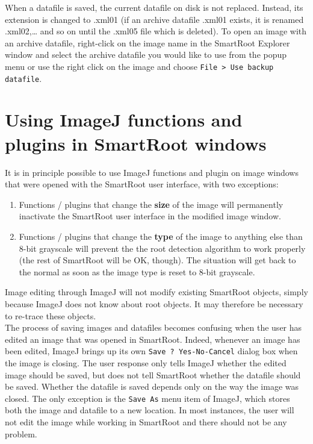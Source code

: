 \documentclass[a4paper,english,10pt]{report}
\begin{document}
When a datafile is saved, the current datafile on disk is not replaced. Instead, its extension is changed to .xml01 (if an archive datafile .xml01 exists, it is renamed .xml02,… and so on until the .xml05 file which is deleted). To open an image with an archive datafile, right-click on the image name in the SmartRoot Explorer window and select the archive datafile you would like to use from the popup menu or use the right click on the image and choose \verb|File > Use backup datafile|.



\newpage
{\color{coolSection}\section{Using ImageJ functions and plugins in SmartRoot windows}}
\label{ijfunc}

It is in principle possible to use ImageJ functions and plugin on image windows that were opened with the SmartRoot user interface, with two exceptions:\\

\begin{enumerate}
\item Functions / plugins that change the \textbf{size} of the image will permanently inactivate the SmartRoot user interface in the modified image window. 
\item Functions / plugins that change the \textbf{type} of the image to anything else than 8-bit grayscale will prevent the the root detection algorithm to work properly (the rest of SmartRoot will be OK, though). The situation will get back to the normal as soon as the image type is reset to 8-bit grayscale.
\end{enumerate}

Image editing through ImageJ will not modify existing SmartRoot objects, simply because ImageJ does not know about root objects. It may therefore be necessary to re-trace these objects.\\

The process of saving images and datafiles becomes confusing when the user has edited an image that was opened in SmartRoot. Indeed, whenever an image has been edited, ImageJ brings up its own \verb|Save ? Yes-No-Cancel| dialog box when the image is closing. The user response only tells ImageJ whether the edited image should be saved, but does not tell SmartRoot whether the datafile should be saved. Whether the datafile is saved depends only on the way the image was closed. The only exception is the \verb|Save As| menu item of ImageJ, which stores both the image and datafile to a new location. In most instances, the user will not edit the image while working in SmartRoot and there should not be any problem.
\end{document}
